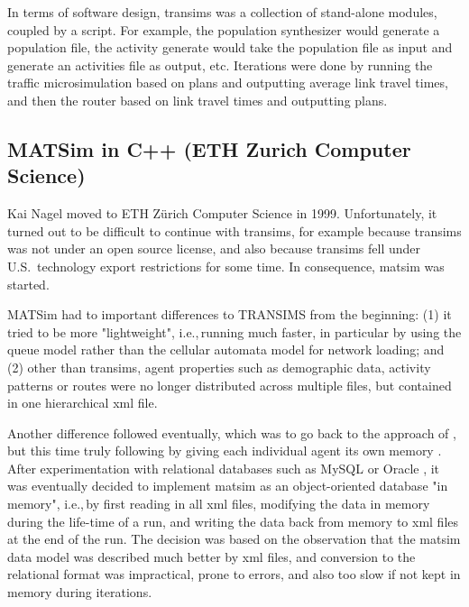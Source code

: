 
In terms of software design, \gls{transims} was a collection of stand-alone modules, coupled by a script.  For example, the population synthesizer would generate a population file, the activity generate would take the population file as input and generate an activities file as output, etc.  Iterations were done by running the traffic microsimulation based on plans and outputting average link travel times, and then the router based on link travel times and outputting plans.


\subsection{MATSim in C++ (ETH Zurich Computer Science)}
\label{sec:history-ethz-phase}


Kai Nagel moved to ETH Zürich Computer Science in 1999.  Unfortunately, it turned out to be difficult to continue with \gls{transims}, for example because \gls{transims} was not under an open source license, and also because \gls{transims} fell under U.S.\ technology export restrictions for some time.  In consequence, \gls{matsim} was started.

MATSim had to important differences to TRANSIMS from the beginning: (1) it tried to be more "lightweight", i.e.,\,running much faster, in particular by using the queue model \citep{GawronPhd,Gawron1998IterativeAlgorithmto} rather than the cellular automata model for network loading; and (2) other than \gls{transims}, agent properties such as demographic data, activity patterns or routes were no longer distributed across multiple files, but contained in one hierarchical \gls{xml} file.

Another difference followed eventually, which was to go back to the approach of \citet{Nagel1996NRW}, but this time truly following \citet{ArthurBar} by giving each individual agent its own memory \citep{RaneyNagel2006traf-framework}.  After experimentation with relational databases such as MySQL \citep{mysql-wikipedia} or Oracle \citep{oracle}, it was eventually decided to implement \gls{matsim} as an object-oriented database "in memory", i.e.,\,by first reading in all \gls{xml} files, modifying the data in memory during the life-time of a run, and writing the data back from memory to \gls{xml} files at the end of the run.  The decision was based on the observation that the \gls{matsim} data model was described much better by \gls{xml} files, and conversion to the relational format was impractical, prone to errors, and also too slow if not kept in memory during iterations. 

